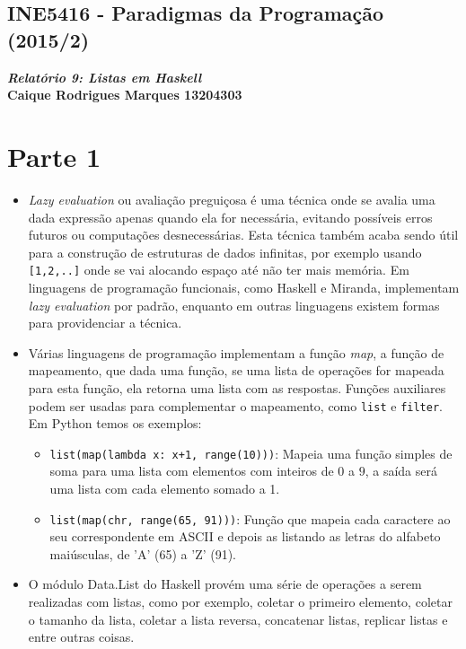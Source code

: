 \documentclass{article}
\begin{document}
    \begin{center}
        \section*{INE5416 - Paradigmas da Programação (2015/2)}
        \textbf{\textit{Relatório 9: Listas em Haskell} \\
        Caique Rodrigues Marques 13204303}
    \end{center}
    
    \section*{Parte 1}
        \begin{itemize}
            \item \textit{Lazy evaluation} ou avaliação preguiçosa é uma técnica onde se avalia uma dada
            expressão apenas quando ela for necessária, evitando possíveis erros futuros ou computações
            desnecessárias. Esta técnica também acaba sendo útil para a construção de estruturas de dados
            infinitas, por exemplo usando \texttt{[1,2,..]} onde se vai alocando espaço até não ter mais
            memória. Em linguagens de programação funcionais, como Haskell e Miranda, implementam
            \textit{lazy evaluation} por padrão, enquanto em outras linguagens existem formas para
            providenciar a técnica.
            
            \item Várias linguagens de programação implementam a função \textit{map}, a função de
            mapeamento,
            que dada uma função, se uma lista de operações for mapeada para esta função, ela retorna uma
            lista com as respostas. Funções auxiliares podem ser usadas para complementar o mapeamento,
            como
            \texttt{list} e \texttt{filter}. Em Python temos os exemplos:
            \begin{itemize}
                \item \texttt{list(map(lambda x: x+1, range(10)))}: Mapeia uma função simples de soma para
                uma lista com elementos com inteiros de $0$ a $9$, a saída será uma lista com cada elemento
                somado a 1.
                
                \item \texttt{list(map(chr, range(65, 91)))}: Função que mapeia cada caractere ao seu
                correspondente em ASCII e depois as listando as letras do alfabeto maiúsculas, de
                'A' (65) a 'Z' (91).
            \end{itemize}
            
            \item O módulo Data.List do Haskell provém uma série de operações a serem realizadas com listas,
            como por exemplo, coletar o primeiro elemento, coletar o tamanho da lista, coletar a lista
            reversa, concatenar listas, replicar listas e entre outras coisas.
        \end{itemize}
\end{document}
